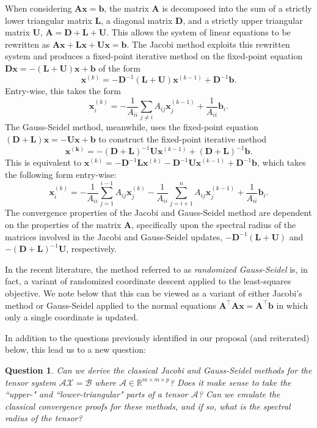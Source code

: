 \documentclass[10.5pt]{amsart}
\newtheorem{question}{Question}
\newcommand{\tens}[1]{\bm{\mathcal{#1}}}
\newcommand{\mat}[1]{\bm{#1}}
\def\tA{{\tens{A}}}  %
\def\tB{{\tens{B}}}  %
\def\tX{{\tens{X}}}  %
\def\vb{{\bm{b}}}
\def\vx{{\bm{x}}}
\begin{document}
When considering $\mat A\bm{x}=\bm{b}$, the matrix $\mat  A$ is decomposed into the sum of a strictly lower triangular matrix $\mat  L$, a diagonal matrix $\mat D$, and a strictly upper triangular matrix $\mat  U$, $\mat  A = \mat D + \mat  L + \mat  U$.  This allows the system of linear equations to be rewritten as $\mat A \vx + \mat L\vx+ \mat U \vx=\bm{b}$. The Jacobi method exploits this rewritten system and produces a fixed-point iterative method on the fixed-point equation $\mat{D} \vx = -(\mat{L} + \mat{U})\vx + \vb$ of the form $$\vx^{(k)} = -\mat{D}^{-1}(\mat{L} + \mat{U})\vx^{(k-1)} + \mat{D}^{-1}\vb.$$ 
Entry-wise, this takes the form 
\[ \vx^{(k)}_i = -\frac{1}{A_{ii}}\sum_{j\neq i} A_{ij}\vx^{(k-1)}_j + \frac{1}{A_{ii}}\vb_i. \]
The Gauss-Seidel method, meanwhile, uses the fixed-point equation $(\mat{D} + \mat{L}) \vx = -\mat{U}\vx + \vb$ to construct the fixed-point iterative method $$\bm{x^{(k)}} = -(\mat{D} + \mat{L})^{-1} \mat{U}\vx^{(k-1)} + (\mat{D} + \mat{L})^{-1}\vb.$$  
This is equivalent to $\vx^{(k)} = -\mat{D}^{-1}\mat{L}\vx^{(k)} - \mat{D}^{-1}\mat{U}\vx^{(k-1)} + \mat{D}^{-1}\vb $, which takes the following form entry-wise:
\[ \vx^{(k)}_i = -\frac{1}{A_{ii}}\sum_{j=1}^{i-1} A_{ij}\vx^{(k)}_j -\frac{1}{A_{ii}}\sum_{j=i+1}^{n} A_{ij}\vx^{(k-1)}_j + \frac{1}{A_{ii}}\vb_i. \]
The convergence properties of the Jacobi and Gauss-Seidel method are dependent on the properties of the matrix $\mat  A$, specifically upon the spectral radius of the matrices involved in the Jacobi and Gauss-Seidel updates, $-\mat{D}^{-1}(\mat{L} + \mat{U})$ and $-(\mat{D} + \mat{L})^{-1} \mat{U}$, respectively. 

In the recent literature, the method referred to as \emph{randomized Gauss-Seidel} is, in fact, a variant of randomized coordinate descent applied to the least-squares objective. We note below that this can be viewed as a variant of either Jacobi's method or Gauss-Seidel applied to the normal equations $\mat{A}^\top \mat{A} \vx = \mat{A}^\top \vb$ in which only a single coordinate is updated.  

In addition to the questions previously identified in our proposal (and reiterated) below, this lead us to a new question:

\begin{question}
    Can we derive the classical Jacobi and Gauss-Seidel methods for the tensor system $\tA \tX = \tB$ where $\tA \in \mathbb{R}^{m \times m \times p}$?  Does it make sense to take the ``upper-" and ``lower-triangular" parts of a tensor $\tA$?  Can we emulate the classical convergence proofs for these methods, and if so, what is the spectral radius of the tensor? \label{ques:classical tensor methods}
\end{question}
\end{document}

